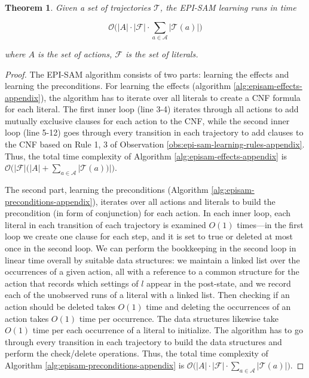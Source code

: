 \documentclass{article}
\theoremstyle{plain}
\newtheorem{theorem}{Theorem}[section]
\theoremstyle{definition}
\theoremstyle{remark}
\theoremstyle{observation}
\begin{document}
\begin{theorem}
Given a set of trajectories $\mathcal{T}$, the EPI-SAM learning runs in time 
\begin{small}
\[\mathcal{O}\Big( |A|\cdot|\mathcal{F}|\cdot \sum_{a\in \mathcal{A}}|\mathcal{T}(a)|    \Big)\]
\end{small}
where $A$ is the set of actions, $\mathcal{F}$ is the set of literals.
\end{theorem}
\begin{proof}
The EPI-SAM algorithm consists of two parts: learning the effects and learning the preconditions. For learning the effects (algorithm \ref{alg:episam-effects-appendix}), the algorithm has to iterate over all literals to create a CNF formula for each literal. The first inner loop (line 3-4) iterates through all actions to add mutually exclusive clauses for each action to the CNF, while the second inner loop (line 5-12) goes through every transition in each trajectory to add clauses to the CNF based on Rule 1, 3 of Observation \ref{obs:epi-sam-learning-rules-appendix}. Thus, the total time complexity of Algorithm \ref{alg:episam-effects-appendix} is $\mathcal{O}\Big(|\mathcal{F}|(|A| + \sum_{a\in \mathcal{A}}|\mathcal{T}(a))|\Big)$.  

The second part, learning the preconditions (Algorithm \ref{alg:episam-preconditions-appendix}), iterates over all actions and literals to build the precondition (in form of conjunction) for each action. In each inner loop, each literal in each transition of each trajectory is examined $O(1)$ times---in the first loop we create one clause for each step, and it is set to true or deleted at most once in the second loop. 
We can perform the bookkeeping in the second loop in linear time overall by suitable data structures: we maintain a linked list over the occurrences of a given action, all with a reference to a common structure for the action that records which settings of $l$ appear in the post-state, and we record each of the unobserved runs of a literal with a linked list. Then checking if an action should be deleted takes $O(1)$ time and deleting the occurrences of an action takes $O(1)$ time per occurrence. The data structures likewise take $O(1)$ time per each occurrence of a literal to initialize. The algorithm has to go through every transition in each trajectory to build the data structures and perform the check/delete operations. Thus, the total time complexity of Algorithm \ref{alg:episam-preconditions-appendix} is $\mathcal{O}\Big(|A|\cdot|\mathcal{F}|\cdot \sum_{a\in \mathcal{A}}|\mathcal{T}(a)|\Big)$.  \end{proof}
\end{document}
